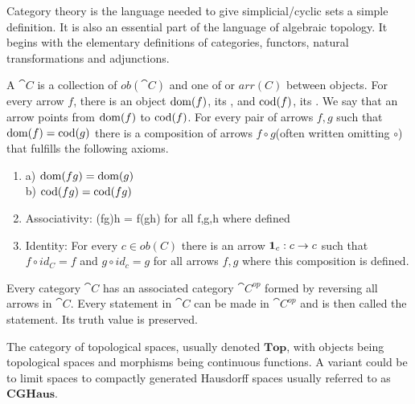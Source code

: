 \documentclass[../../main.tex]{subfiles}
\begin{document}
    Category theory is the language needed to give simplicial/cyclic sets a simple definition. It is also an essential part of the language of algebraic topology. It begins with the elementary definitions of categories, functors, natural transformations and adjunctions.
        
    \begin{definition}
        A  $\cat{C}$ is a collection of  $ob(\cat{C})$ and one of  or  $arr(C)$ between objects. For every arrow $f$, there is an object $\domain{f}$, its , and $\codomain{f}$, its . We say that an arrow points from $\domain{f}$ to $\codomain{f}$. For every pair of arrows $f, g$ such that $\domain{f} = \codomain{g}$ there is a composition of arrows $f \circ g$(often written omitting $\circ$) that fulfills the following axioms.
        
        \begin{enumerate}
            \item a) $\domain{fg} = \domain{g}$ \\
                b) $\codomain{fg} = \codomain{fg}$
            \item Associativity: (fg)h = f(gh) for all f,g,h where defined
            \item Identity: For every $c \in ob(C)$ there is an arrow $\idarrow[c]: c \to c$ such that $f \circ id_C = f$ and $g \circ id_c = g$ for all arrows $f, g$ where this composition is defined.
        \end{enumerate}
    \end{definition}
    
    Every category $\cat{C}$ has an associated category $\cat{C^{op}}$ formed by reversing all arrows in $\cat{C}$. Every statement in $\cat{C}$ can be made in $\cat{C^{op}}$ and is then called the  statement. Its truth value is preserved.

    \begin{example}
        The category of topological spaces, usually denoted $\mathbf{Top}$, with objects being topological spaces and morphisms being continuous functions. A variant could be to limit spaces to compactly generated Hausdorff spaces usually referred to as $\mathbf{CGHaus}$.
    \end{example}
\end{document}
